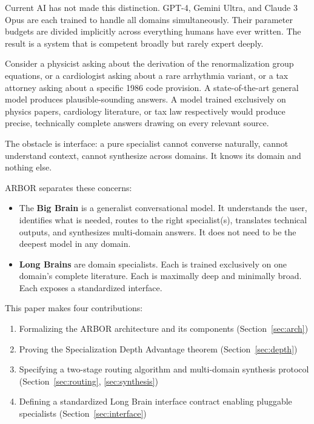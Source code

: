 \documentclass[12pt]{article}
\begin{document}
Current AI has not made this distinction. GPT-4, Gemini Ultra, and Claude 3 Opus are each trained to handle all domains simultaneously. Their parameter budgets are divided implicitly across everything humans have ever written. The result is a system that is competent broadly but rarely expert deeply.

Consider a physicist asking about the derivation of the renormalization group equations, or a cardiologist asking about a rare arrhythmia variant, or a tax attorney asking about a specific 1986 code provision. A state-of-the-art general model produces plausible-sounding answers. A model trained exclusively on physics papers, cardiology literature, or tax law respectively would produce precise, technically complete answers drawing on every relevant source.

The obstacle is interface: a pure specialist cannot converse naturally, cannot understand context, cannot synthesize across domains. It knows its domain and nothing else.

ARBOR separates these concerns:
\begin{itemize}
    \item The \textbf{Big Brain} is a generalist conversational model. It understands the user, identifies what is needed, routes to the right specialist(s), translates technical outputs, and synthesizes multi-domain answers. It does not need to be the deepest model in any domain.
    \item \textbf{Long Brains} are domain specialists. Each is trained exclusively on one domain's complete literature. Each is maximally deep and minimally broad. Each exposes a standardized interface.
\end{itemize}

This paper makes four contributions:
\begin{enumerate}
    \item Formalizing the ARBOR architecture and its components (Section~\ref{sec:arch})
    \item Proving the Specialization Depth Advantage theorem (Section~\ref{sec:depth})
    \item Specifying a two-stage routing algorithm and multi-domain synthesis protocol (Section~\ref{sec:routing}, \ref{sec:synthesis})
    \item Defining a standardized Long Brain interface contract enabling pluggable specialists (Section~\ref{sec:interface})
\end{enumerate}

\end{document}
